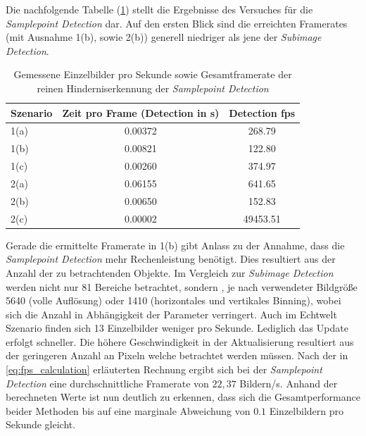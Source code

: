 \noindent
Die nachfolgende Tabelle (\ref{tbl:samplepoint_framerate}) stellt die Ergebnisse des Versuches für die \emph{Samplepoint Detection} dar. Auf den ersten Blick sind die erreichten Framerates (mit Ausnahme 1(b), sowie 2(b)) generell niedriger als jene der \emph{Subimage Detection}. 

\begin{table}[h]
\centering
\begin{tabular}{|l|c|c|}
\hline
Szenario & Zeit pro Frame (Detection in s) & Detection fps \\ \hline \hline
1(a)     & 0.00372           			  & 268.79    \\ \hline
1(b)     & 0.00821           			  & 122.80    \\ \hline
1(c)     & 0.00260           			  & 374.97    \\ \hline \hline
2(a)     & 0.06155           			  & 641.65    \\ \hline
2(b)     & 0.00650           		  	  & 152.83    \\ \hline
2(c)     & 0.00002           	 		  & 49453.51  \\ \hline
\end{tabular}
\caption{Gemessene Einzelbilder pro Sekunde sowie Gesamtframerate der reinen Hinderniserkennung der \emph{Samplepoint Detection}}
\label{tbl:samplepoint_framerate}
\end{table}

\noindent
Gerade die ermittelte Framerate in 1(b) gibt Anlass zu der Annahme, dass die \emph{Samplepoint Detection} mehr Rechenleistung benötigt. Dies resultiert aus der Anzahl der zu betrachtenden Objekte. Im Vergleich zur \emph{Subimage Detection} werden nicht nur 81 Bereiche betrachtet, sondern , je nach verwendeter Bildgröße 5640 (volle Auflösung) oder 1410 (horizontales und vertikales Binning), wobei sich die Anzahl in Abhängigkeit der Parameter verringert. Auch im Echtwelt Szenario finden sich 13 Einzelbilder weniger pro Sekunde. Lediglich das Update erfolgt schneller. Die höhere Geschwindigkeit in der Aktualisierung resultiert aus der geringeren Anzahl an Pixeln welche betrachtet werden müssen. Nach der in \ref{eq:fps_calculation} erläuterten Rechnung ergibt sich bei der \emph{Samplepoint Detection} eine durchschnittliche Framerate von $22,37$ Bildern/s. Anhand der berechneten Werte ist nun deutlich zu erkennen, dass sich die Gesamtperformance beider Methoden bis auf eine marginale Abweichung von $0.1$ Einzelbildern pro Sekunde gleicht.\\

